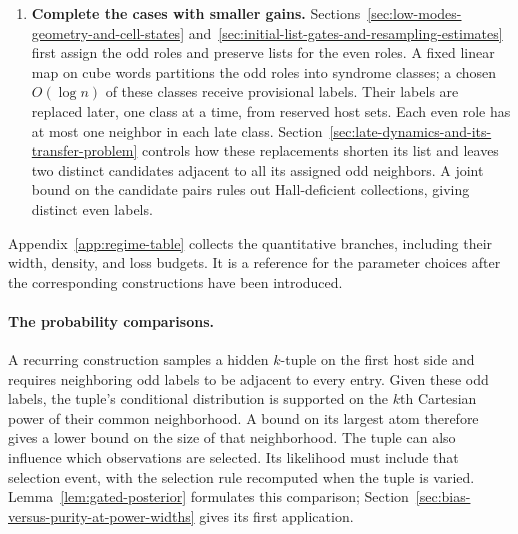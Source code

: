 \begin{enumerate}[leftmargin=*]
Smaller host sets and crossing edges reduce the available common
neighborhoods, so the construction needs a compensating gain. For
comparison, suppose that each of $n$ independent restrictions retains
each label with probability $1/2+\delta$. A set of size $M$ would then
leave an expected $M(1/2+\delta)^n$ labels. Relative to $N2^{-n}$, the factor is
$(M/N)(1+2\delta)^n$: the accumulated density surplus can compensate for
the smaller support. The proof obtains the needed gain either from edge
density or from common-neighbor density inside cluster patches, and
bounds the additional losses from crossing edges and dependent choices.
Section~\ref{sec:internal-solver-and-profiles-for-these-tilings}
constructs the laws used inside cluster patches. When the gain is large
enough, Section~\ref{sec:high-modes-of-the-tiling} assigns the odd roles
injectively and bounds the column sums of the even laws supported on
$L_v$. Hall's theorem then completes the embedding.

\item \textbf{Complete the cases with smaller gains.}
Sections~\ref{sec:low-modes-geometry-and-cell-states}
and~\ref{sec:initial-list-gates-and-resampling-estimates} first assign
the odd roles and preserve lists for the even roles. A fixed linear map
on cube words partitions the odd roles into syndrome classes; a chosen
$O(\log n)$ of these classes receive provisional labels. Their labels
are replaced later, one class at a time, from reserved host sets. Each
even role has at most one neighbor in each late class.
Section~\ref{sec:late-dynamics-and-its-transfer-problem} controls how
these replacements shorten its list and leaves two distinct candidates
adjacent to all its assigned odd neighbors. A joint bound on the
candidate pairs rules out Hall-deficient collections, giving distinct
even labels.
\end{enumerate}

Appendix~\ref{app:regime-table} collects the quantitative branches,
including their width, density, and loss budgets. It is a reference for
the parameter choices after the corresponding constructions have been
introduced.

\paragraph{The probability comparisons.}
A recurring construction samples a hidden $k$-tuple on the first host
side and requires neighboring odd labels to be adjacent to every entry.
Given these odd labels, the tuple's conditional distribution is supported
on the $k$th Cartesian power of their common neighborhood. A bound on its largest atom
therefore gives a lower bound on the size of that neighborhood. The tuple
can also influence which observations are selected. Its likelihood must
include that selection event, with the selection rule recomputed when the
tuple is varied. Lemma~\ref{lem:gated-posterior} formulates this comparison;
Section~\ref{sec:bias-versus-purity-at-power-widths} gives its first
application.

